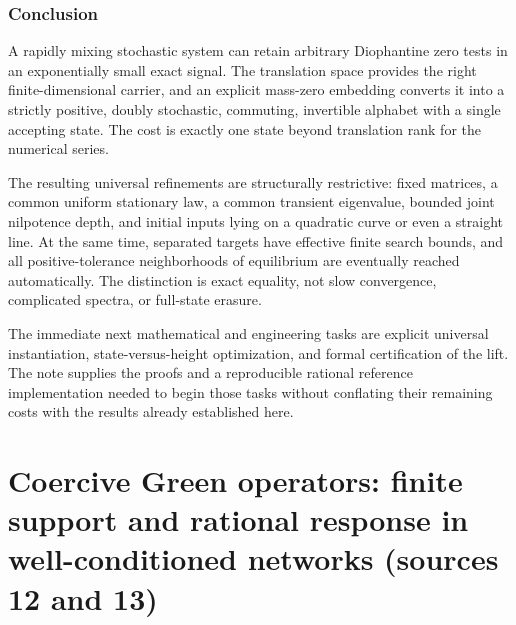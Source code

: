 \documentclass[11pt,letterpaper]{article}
\theoremstyle{definition}
\theoremstyle{remark}
\begin{document}
\section{Conclusion}

A rapidly mixing stochastic system can retain arbitrary Diophantine zero tests
in an exponentially small exact signal. The translation space provides the
right finite-dimensional carrier, and an explicit mass-zero embedding converts
it into a strictly positive, doubly stochastic, commuting, invertible alphabet
with a single accepting state. The cost is exactly one state beyond translation
rank for the numerical series.

The resulting universal refinements are structurally restrictive: fixed
matrices, a common uniform stationary law, a common transient eigenvalue,
bounded joint nilpotence depth, and initial inputs lying on a quadratic curve
or even a straight line. At the same time, separated targets have effective
finite search bounds, and all positive-tolerance neighborhoods of equilibrium
are eventually reached automatically. The distinction is exact equality, not
slow convergence, complicated spectra, or full-state erasure.

The immediate next mathematical and engineering tasks are explicit universal
instantiation, state-versus-height optimization, and formal certification of
the lift. The note supplies the proofs and a reproducible rational reference
implementation needed to begin those tasks without conflating their remaining
costs with the results already established here.

\part{Coercive Green operators: finite support and rational response in well-conditioned networks (sources 12 and 13)}\label{ste:part:cg}
\end{document}
